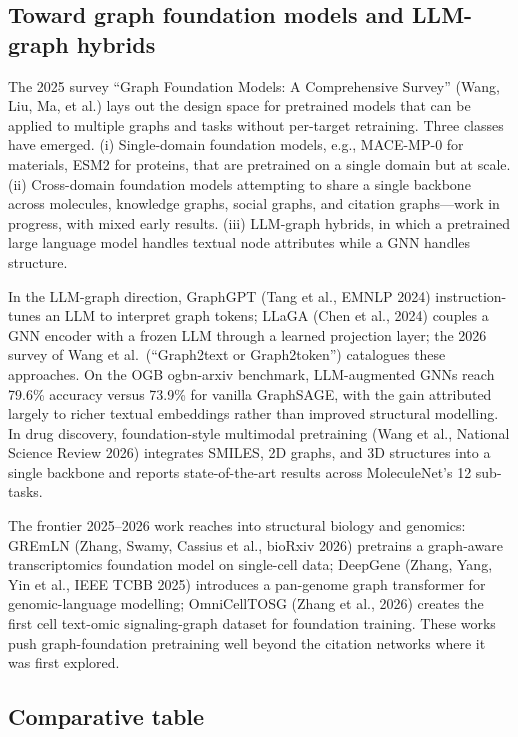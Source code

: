 \subsection{Toward graph foundation models and LLM-graph hybrids}\label{toward-graph-foundation-models-and-llm-graph-hybrids}

The 2025 survey ``Graph Foundation Models: A Comprehensive Survey'' (Wang, Liu, Ma, et al.) lays out the design space for pretrained models that can be applied to multiple graphs and tasks without per-target retraining. Three classes have emerged. (i) Single-domain foundation models, e.g., MACE-MP-0 for materials, ESM2 for proteins, that are pretrained on a single domain but at scale. (ii) Cross-domain foundation models attempting to share a single backbone across molecules, knowledge graphs, social graphs, and citation graphs---work in progress, with mixed early results. (iii) LLM-graph hybrids, in which a pretrained large language model handles textual node attributes while a GNN handles structure.

In the LLM-graph direction, GraphGPT (Tang et al., EMNLP 2024) instruction-tunes an LLM to interpret graph tokens; LLaGA (Chen et al., 2024) couples a GNN encoder with a frozen LLM through a learned projection layer; the 2026 survey of Wang et al.~(``Graph2text or Graph2token'') catalogues these approaches. On the OGB ogbn-arxiv benchmark, LLM-augmented GNNs reach 79.6\% accuracy versus 73.9\% for vanilla GraphSAGE, with the gain attributed largely to richer textual embeddings rather than improved structural modelling. In drug discovery, foundation-style multimodal pretraining (Wang et al., National Science Review 2026) integrates SMILES, 2D graphs, and 3D structures into a single backbone and reports state-of-the-art results across MoleculeNet's 12 sub-tasks.

The frontier 2025--2026 work reaches into structural biology and genomics: GREmLN (Zhang, Swamy, Cassius et al., bioRxiv 2026) pretrains a graph-aware transcriptomics foundation model on single-cell data; DeepGene (Zhang, Yang, Yin et al., IEEE TCBB 2025) introduces a pan-genome graph transformer for genomic-language modelling; OmniCellTOSG (Zhang et al., 2026) creates the first cell text-omic signaling-graph dataset for foundation training. These works push graph-foundation pretraining well beyond the citation networks where it was first explored.

\subsection{Comparative table}\label{comparative-table-2}

